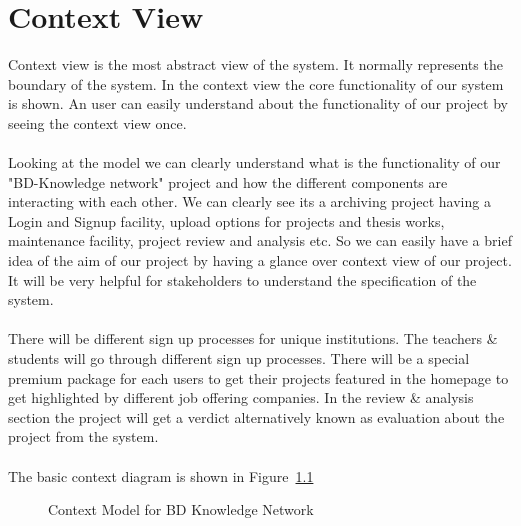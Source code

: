 \documentclass{scrreprt}
\begin{document}
\chapter{Context View}
Context view is the most abstract view of the system. It normally represents the boundary of the system. In the context view the core functionality of our system is shown. An user can easily understand about the functionality of our project by seeing the context view once. \\\\Looking at the model we can clearly understand what is the functionality of our "BD-Knowledge network" project and how the different components are interacting with each other. We can clearly see its a archiving project having a Login and Signup facility, upload options for projects and thesis works, maintenance facility, project review and analysis etc. So we can easily have a brief idea of the aim of our project by having a glance over context view of our project. It will be very helpful for stakeholders to understand the specification of the system. \\\\ There will be different sign up processes for unique institutions. The teachers \& students will go through different sign up processes. There will be a special premium package for each users to get their projects featured in the homepage to get highlighted by different job offering companies. In the review \& analysis section the project will get a verdict alternatively known as evaluation about the project from the system. \\\\ The basic context diagram is shown in Figure~\ref{CM}
\begin{figure}
\begin{center}
\end{center} 
\caption{Context Model for BD Knowledge Network\label{CM}}
\end{figure}
\end{document}
